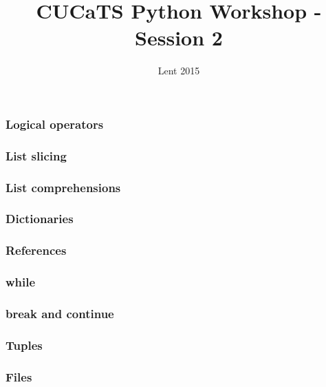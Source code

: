 \documentclass[notes]{beamer}
\title{CUCaTS Python Workshop - Session 2}
\date{Lent 2015}
\begin{document}
	\begin{frame}[fragile]
		\maketitle
	\end{frame}
	
	
	\begin{frame}[fragile]
		\frametitle{Logical operators}
	\end{frame}
	
	\begin{frame}[fragile]
		\frametitle{List slicing}
	\end{frame}
	
	\begin{frame}[fragile]
		\frametitle{List comprehensions}
	\end{frame}
	
	\begin{frame}[fragile]
		\frametitle{Dictionaries}
	\end{frame}
	
	\begin{frame}[fragile]
		\frametitle{References}
	\end{frame}
	
	\begin{frame}[fragile]
		\frametitle{}
	\end{frame}
	
	\begin{frame}[fragile]
		\frametitle{while}
	\end{frame}
	
	\begin{frame}[fragile]
		\frametitle{break and continue}
	\end{frame}
	
	\begin{frame}[fragile]
		\frametitle{Tuples}
	\end{frame}
	
	\begin{frame}[fragile]
		\frametitle{Files}
	\end{frame}
\end{document}
